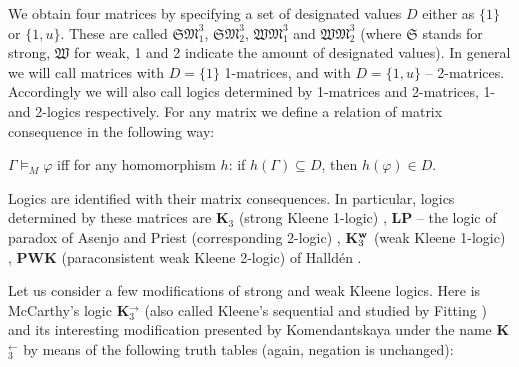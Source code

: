 \documentclass[11pt,a4paper,titlepage]{article}
\theoremstyle{definition}
\newcommand{\3}{\vspace{.3in}}
\newcommand{\2}{\vspace{.2in}}
\newcommand{\1}{\vspace{.1in}}
\newcommand{\5}{\vspace{.05in}}
\begin{document}
We obtain four matrices by specifying a set of designated values $D$ either as $\{ 1 \}$ or $\{1, u \}$. 
These are called $\mathfrak{SM}_1^3$, $\mathfrak{SM}_2^3$, $\mathfrak{WM}_1^3$ and $\mathfrak{WM}_2^3$ (where $\mathfrak{S}$ stands for strong, $\mathfrak{W}$ for weak, 1 and 2 indicate the amount of designated values). In general we will call matrices with $D = \{ 1 \}$ 1-matrices, and with $D= \{1, u \}$ -- 2-matrices. Accordingly we will also call logics determined by 1-matrices and 2-matrices, 1- and 2-logics respectively.
For any matrix we define a relation of matrix consequence in the following way:

\1

$\Gamma \models_M\varphi $ iff for any homomorphism $h$:
if $h(\Gamma)\subseteq D$, then $h(\varphi)\in D$. 

\1

Logics are identified with their matrix consequences. In particular,
logics determined by these matrices are {\bf K$_3$} (strong Kleene 1-logic) \cite{Kleene}, {\bf LP} -- the logic of paradox of Asenjo and Priest (corresponding 2-logic) \cite{Asenjo,Priest}, {\bf K}$_3^{\bf w}$ (weak Kleene 1-logic) \cite{Kleene}, {\bf PWK} (paraconsistent weak Kleene 2-logic) of Halld\'{e}n \cite{Hallden}. 

Let us consider a few modifications of strong and weak Kleene logics. Here is McCarthy's logic {\bf K$_3^\rightarrow$} \cite{McCarty} (also called Kleene's sequential and studied by Fitting \cite{Fitting94})  
and its interesting modification presented by Ko\-men\-dant\-skaya \cite{Komendantskaya} under the name  {\bf K$_3^\leftarrow$} by means of the following truth tables (again, negation is unchanged):
\end{document}
